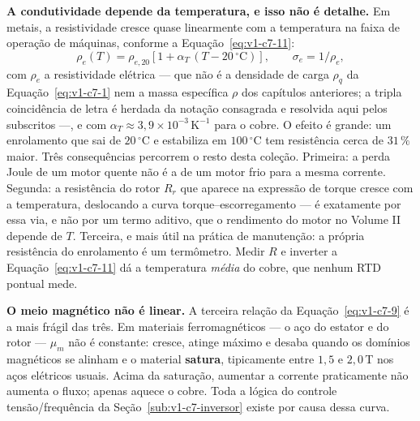 \documentclass[12pt,a4paper]{article}
\numberwithin{equation}{section}
\numberwithin{table}{section}
\numberwithin{figure}{section}
\begin{document}
\textbf{A condutividade depende da temperatura, e isso não é detalhe.} Em
metais, a resistividade cresce quase linearmente com a temperatura na faixa de
operação de máquinas, conforme a Equação~\eqref{eq:v1-c7-11}:
\begin{equation}\label{eq:v1-c7-11}
\rho_{e}(T) = \rho_{e,20}\left[1 + \alpha_T\,(T - 20\,^{\circ}\mathrm{C})\right],
\qquad
\sigma_e = 1/\rho_e ,
\end{equation}
com $\rho_e$ a resistividade elétrica --- que não é a densidade de carga
$\rho_q$ da Equação~\eqref{eq:v1-c7-1} nem a massa específica $\rho$ dos
capítulos anteriores; a tripla coincidência de letra é herdada da notação
consagrada e resolvida aqui pelos subscritos ---, e
com $\alpha_T \approx 3{,}9\times10^{-3}\,\mathrm{K}^{-1}$ para o cobre. O
efeito é grande: um enrolamento que sai de $20\,^{\circ}$C e estabiliza em
$100\,^{\circ}$C tem resistência cerca de $31\,\%$ maior. Três consequências
percorrem o resto desta coleção. Primeira: a perda Joule de um motor quente não
é a de um motor frio para a mesma corrente. Segunda: a resistência do rotor
$R_r$ que aparece na expressão de torque cresce com a temperatura, deslocando a
curva torque--escorregamento --- é exatamente por essa via, e não por um termo
aditivo, que o rendimento do motor no Volume II depende de $T$. Terceira, e
mais útil na prática de manutenção: a própria resistência do enrolamento é um
termômetro. Medir $R$ e inverter a Equação~\eqref{eq:v1-c7-11} dá a temperatura
\emph{média} do cobre, que nenhum RTD pontual mede.

\textbf{O meio magnético não é linear.} A terceira relação da
Equação~\eqref{eq:v1-c7-9} é a mais frágil das três. Em materiais
ferromagnéticos --- o aço do estator e do rotor --- $\mu_m$ não é constante:
cresce, atinge máximo e desaba quando os domínios magnéticos se alinham e o
material \textbf{satura}, tipicamente entre $1{,}5$ e $2{,}0\,$T nos aços
elétricos usuais. Acima da saturação, aumentar a corrente praticamente não
aumenta o fluxo; apenas aquece o cobre. Toda a lógica do controle
tensão/frequência da Seção~\ref{sub:v1-c7-inversor} existe por causa dessa
curva.
\end{document}
